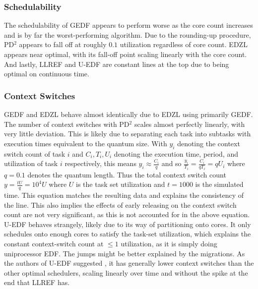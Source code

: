 \documentclass[conference,compsoc]{IEEEtran}
\begin{document}
\subsubsection{Schedulability} The schedulability of GEDF appears to perform worse as the core count increases and is by far the worst-performing algorithm. Due to the rounding-up procedure, PD$^2$ appears to fall off at roughly $0.1$ utilization regardless of core count. EDZL appears near optimal, with its fall-off point scaling linearly with the core count. And lastly, LLREF and U-EDF are constant lines at the top due to being optimal on continuous time.

\subsubsection{Context Switches} GEDF and EDZL behave almost identically due to EDZL using primarily GEDF. The number of context switches with PD$^2$ scales almost perfectly linearly, with very little deviation. This is likely due to separating each task into subtasks with execution times equivalent to the quantum size. With $y_i$ denoting the context switch count of task $i$ and $C_i, T_i, U_i$ denoting the execution time, period, and utilization of task $i$ respectively, this means $y_i \approx \frac{C_i}{q}$ and so $\frac{y_i}{T_i} = \frac{C_i}{qT_i} = qU_i$ where $q = 0.1$ denotes the quantum length. Thus the total context switch count $y = \frac{tU}{q} = 10^4U$ where $U$ is the task set utilization and $t = 1000$ is the simulated time. This equation matches the resulting data and explains the consistency of the line. This also implies the effects of early releasing on the context switch count are not very significant, as this is not accounted for in the above equation. U-EDF behaves strangely, likely due to its way of partitioning onto cores. It only schedules onto enough cores to satisfy the task-set utilization, which explains the constant context-switch count at $\leq1$ utilization, as it is simply doing uniprocessor EDF. The jumps might be better explained by the migrations. As the authors of U-EDF suggested \cite{uedf}, it has generally lower context switches than the other optimal schedulers, scaling linearly over time and without the spike at the end that LLREF has.
\end{document}
